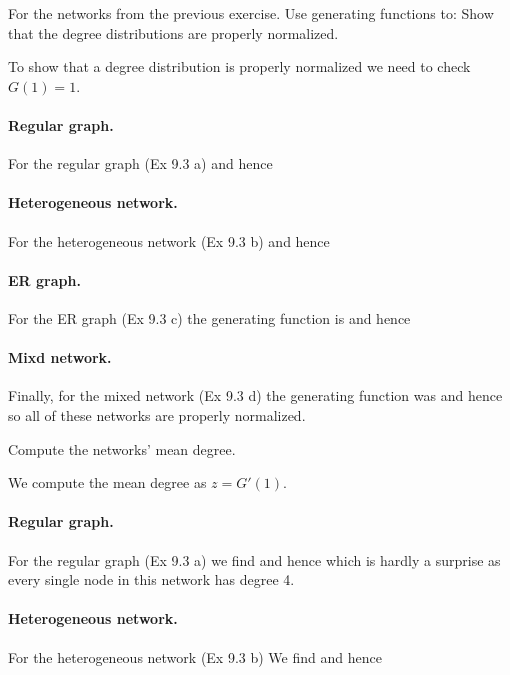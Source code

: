 For the networks from the previous exercise. Use generating functions to:
\subquestion Show that the degree distributions are properly normalized.

\solution 
To show that a degree distribution is properly normalized we need to check $G(1)=1$. 
\paragraph{Regular graph.}For the regular graph (Ex 9.3 a) 
and hence 

\paragraph{Heterogeneous network.}For the heterogeneous network (Ex 9.3 b) 
and hence 

\paragraph{ER graph.}For the ER graph (Ex 9.3 c) the generating function is 
and hence 

\paragraph{Mixd network.}Finally, for the mixed network (Ex 9.3 d) the generating function was  
and hence 
so all of these networks are properly normalized. 

\subquestion Compute the networks' mean degree. 

\solution
We compute the mean degree as $z=G'(1)$. 
\paragraph{Regular graph.}For the regular graph (Ex 9.3 a) 
we find 
and hence 
which is hardly a surprise as every single node in this network has degree 4.

\paragraph{Heterogeneous network.}For the heterogeneous network (Ex 9.3 b) 
We find 
and hence 

